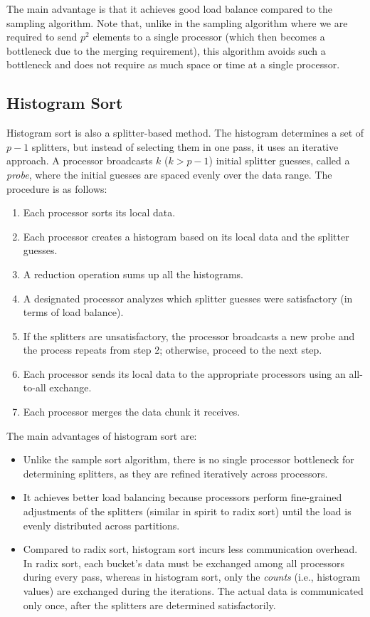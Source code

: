 \documentclass[12pt]{book}
\begin{document}
The main advantage is that it achieves good load balance compared to the sampling algorithm. Note that, unlike in the sampling algorithm where we are required to send $p^2$ elements to a single processor (which then becomes a bottleneck due to the merging requirement), this algorithm avoids such a bottleneck and does not require as much space or time at a single processor.

\subsection{Histogram Sort}
Histogram sort is also a splitter-based method. The histogram determines a set of $p-1$ splitters, but instead of selecting them in one pass, it uses an iterative approach. A processor broadcasts $k$ ($k > p-1$) initial splitter guesses, called a \emph{probe}, where the initial guesses are spaced evenly over the data range. The procedure is as follows:

\begin{enumerate}
    \item Each processor sorts its local data.
    \item Each processor creates a histogram based on its local data and the splitter guesses.
    \item A reduction operation sums up all the histograms.
    \item A designated processor analyzes which splitter guesses were satisfactory (in terms of load balance).
    \item If the splitters are unsatisfactory, the processor broadcasts a new probe and the process repeats from step 2; otherwise, proceed to the next step.
    \item Each processor sends its local data to the appropriate processors using an all-to-all exchange.
    \item Each processor merges the data chunk it receives.
\end{enumerate}

The main advantages of histogram sort are:
\begin{itemize}
    \item Unlike the sample sort algorithm, there is no single processor bottleneck for determining splitters, as they are refined iteratively across processors.
    \item It achieves better load balancing because processors perform fine-grained adjustments of the splitters (similar in spirit to radix sort) until the load is evenly distributed across partitions.
    \item Compared to radix sort, histogram sort incurs less communication overhead. In radix sort, each bucket’s data must be exchanged among all processors during every pass, whereas in histogram sort, only the \emph{counts} (i.e., histogram values) are exchanged during the iterations. The actual data is communicated only once, after the splitters are determined satisfactorily.
\end{itemize}
\end{document}
